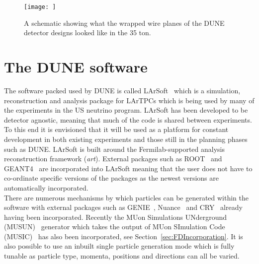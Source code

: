 \begin{figure}[h]
  \centering
  \texttt{[image: ]}
  \caption[The wrapped wires of the 35 ton]{A schematic showing what the wrapped wire planes of the DUNE detector designs looked like in the 35 ton.}
  \label{fig:35tonWireGeom}
\end{figure}

\section{The DUNE software} \label{sec:LArSoft} %
The software packed used by DUNE is called LArSoft~\citep{Church_LArSoft} which is a simulation, reconstruction and analysis package for LArTPCs which is being used by many of the experiments in the US neutrino program. LArSoft has been developed to be detector agnostic, meaning that much of the code is shared between experiments. To this end it is envisioned that it will be used as a platform for constant development in both existing experiments and those still in the planning phases such as DUNE. LArSoft is built around the Fermilab-supported analysis reconstruction framework (\emph{art}). External packages such as ROOT~\citep{ROOT} and GEANT4~\citep{GEANT4} are incorporated into LArSoft meaning that the user does not have to co-ordinate specific versions of the packages as the newest versions are automatically incorporated. \\

There are numerous mechanisms by which particles can be generated within the software with external packages such as GENIE~\citep{GENIE}, Nuance~\citep{Nuance} and CRY~\citep{CRY} already having been incorporated. Recently the MUon Simulations UNderground (MUSUN)~\citep{MUSUN} generator which takes the output of MUon SImulation Code (MUSIC)~\citep{MUSIC} has also been incorporated, see Section~\ref{sec:FDIncorporation}. It is also possible to use an inbuilt single particle generation mode which is fully tunable as particle type, momenta, positions and directions can all be varied. \\

